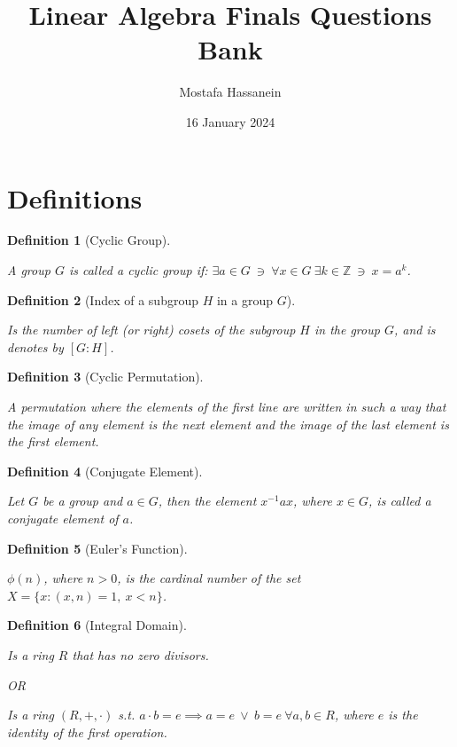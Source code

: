 \documentclass{article}
\author{Mostafa Hassanein}
\title{Linear Algebra Finals Questions Bank}
\date{16 January 2024}
\newtheorem{definition}{Definition}
\begin{document}
\maketitle

\newpage

\section*{Definitions}

\begin{definition}[Cyclic Group]
  $ $

  A group $G$ is called a cyclic group if: $\exists a \in G \ \ni \ \forall x \in G \ \exists k \in \mathbb{Z} \ \ni \ x=a^k$.
\end{definition}

\begin{definition}[Index of a subgroup $H$ in a group $G$]
  $ $

  Is the number of left (or right) cosets of the subgroup $H$ in the group $G$, and is denotes by $[G:H]$.
\end{definition}


\begin{definition}[Cyclic Permutation]
  $ $

  A permutation where the elements of the first line are written in such a way that the image of any element is the next element and the image of the last element is the first element.
\end{definition}


\begin{definition}[Conjugate Element]
  $ $

  Let $G$ be a group and $a \in G$, then the element $x^{-1}ax$, where $x \in G$, is called a conjugate element of $a$.
\end{definition}


\begin{definition}[Euler's Function]
  $ $

  $\phi(n)$, where $n > 0$, is the cardinal number of the set $X=\{x: (x,n)=1, \ x<n \}$.
\end{definition}

\begin{definition}[Integral Domain]
  $ $

  Is a ring $R$ that has no zero divisors.
  
  OR

  Is a ring $(R, +, \cdot )$ s.t. $a\cdot b = e \implies a=e \ \lor \ b=e \ \forall a,b \in R$, where $e$ is the identity of the first operation.
\end{definition}
\end{document}
